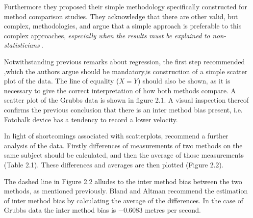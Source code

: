 \documentclass{report}
\begin{document}
Furthermore they proposed their simple methodology specifically
constructed for method comparison studies. They acknowledge that
there are other valid, but complex, methodologies, and argue that
a simple approach is preferable to this complex approaches,
\emph{especially when the results must be explained to
	non-statisticians} \citep*{BA83}.

\smallskip

Notwithstanding previous remarks about regression, the first step
recommended ,which the authors argue should be mandatory,is
construction of a simple scatter plot of the data. The line of
equality ($X=Y$) should also be shown, as it is necessary to give
the correct interpretation of how both methods compare. A scatter
plot of the Grubbs data is shown in figure 2.1. A visual
inspection thereof confirms the previous conclusion that there is
an inter method bias present, i.e. Fotobalk device has a tendency
to record a lower velocity.


In light of shortcomings associated with scatterplots,
\citet*{BA83} recommend a further analysis of the data. Firstly
differences of measurements of two methods on the same subject
should  be calculated, and then the average of those measurements
(Table 2.1). These differences and averages are then plotted
(Figure 2.2).




The dashed line in Figure 2.2 alludes to the inter method bias
between the two methods, as mentioned previously. Bland and Altman
recommend the estimation of inter method bias by calculating the
average of the differences. In the case of Grubbs data the inter
method bias is $-0.6083$ metres per second.
\newpage
\end{document}
